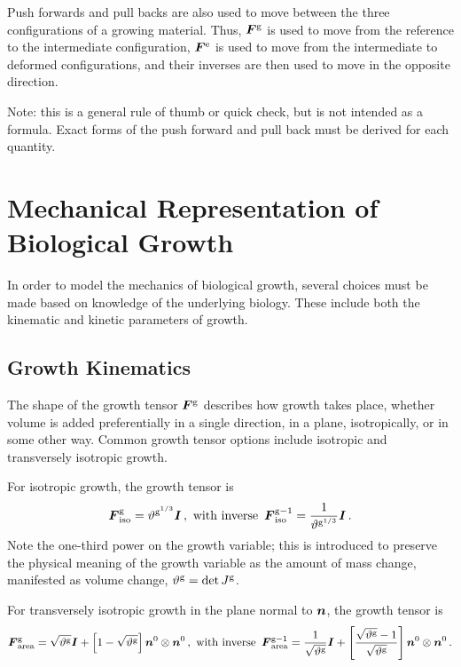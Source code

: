 \documentclass[10pt,letterpaper,oneside]{report}
\newcommand{\ten}[1]{\mbox{\boldmath $#1$}{}}
\newcommand{\scas}[1]{\mbox{{\scriptsize{${\rm{#1}}$}}}{}}
\begin{document}
\begin{itemize}
Push forwards and pull backs are also used to move between the three configurations of a growing material.  Thus, $\ten{F}^{\scas{g}}$ is used to move from the reference to the intermediate configuration, $\ten{F}^{\scas{e}}$ is used to move from the intermediate to deformed configurations, and their inverses are then used to move in the opposite direction. 

Note: this is a general rule of thumb or quick check, but is not intended as a formula.  Exact forms of the push forward and pull back must be derived for each quantity.


\section{Mechanical Representation of Biological Growth}
In order to model the mechanics of biological growth, several choices must be made based on knowledge of the underlying biology.  These include both the kinematic and kinetic parameters of growth.  

\subsection{Growth Kinematics}

The shape of the growth tensor $\ten{F}^{\scas{g}}$ describes how growth takes place, whether volume is added preferentially in a single direction, in a plane, isotropically, or in some other way. Common growth tensor options include isotropic and transversely isotropic growth.  

For isotropic growth, the growth tensor is
\begin{equation}
\ten{F}^{\scas{g}}_{\scas{iso}} = \vartheta^{\scas{g}^{1/3}} \ten{I} 
\, , \mbox{  with inverse  } \, 
\ten{F}^{\scas{g}-1}_{\scas{iso}} = \frac{1}{\vartheta^{\scas{g}^{1/3}}} \ten{I} \, .
\label{Fg_iso}
\end{equation}
Note the one-third power on the growth variable; this is introduced to preserve the physical meaning of the growth variable as the amount of mass change, manifested as volume change, $\vartheta^{\scas{g}} = \det J^{\scas{g}}$.

For transversely isotropic growth in the plane normal to $\ten{n}$, the growth tensor is
\begin{equation}
\ten{F}^{\scas{g}}_{\scas{area}} = \sqrt{\vartheta^{\scas{g}}} \ten{I} + \left[ 1 - \sqrt{\vartheta^{\scas{g}}} \right] \ten{n}^0 \otimes \ten{n}^0
\, , \mbox{  with inverse  } \, 
\ten{F}^{\scas{g}-1}_{\scas{area}} = \frac{1}{\sqrt{\vartheta^{\scas{g}}} } \ten{I} + \left[ \frac{\sqrt{\vartheta^{\scas{g}}}  - 1}{\sqrt{\vartheta^{\scas{g}}} } \right] \ten{n}^0 \otimes \ten{n}^0 \, .
\label{Fg_area}
\end{equation}


\end{itemize}
\end{document}
